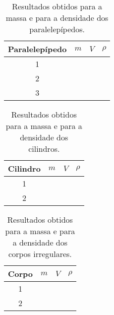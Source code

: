 \begin{table*}[!htpb]
	\label{TabelaDadosMassa}
	\begin{center}
	\begin{tabular}{cp{25mm}p{25mm}p{25mm}}
		\toprule
		Paralelepípedo & $m$ & $V$ & $\rho$ \\
		\midrule
		\cellcolor[gray]{0.89}1 & \cellcolor[gray]{0.92} & \cellcolor[gray]{0.89} & \cellcolor[gray]{0.92} \\
		\cellcolor[gray]{0.95}2 & \cellcolor[gray]{0.97} & \cellcolor[gray]{0.95} & \cellcolor[gray]{0.97} \\
		\cellcolor[gray]{0.89}3 & \cellcolor[gray]{0.92} & \cellcolor[gray]{0.89} & \cellcolor[gray]{0.92} \\
		\bottomrule
	\end{tabular}
	\end{center}
	\caption{Resultados obtidos para a massa e para a densidade dos paralelepípedos.}
\end{table*}

\begin{table*}[!ht]
	\label{TabelaDadosMassaCil}
	\begin{center}
	\begin{tabular}{cp{25mm}p{25mm}p{25mm}}
		\toprule
		Cilindro & $m$ & $V$ & $\rho$ \\
		\midrule
		\cellcolor[gray]{0.89}1 & \cellcolor[gray]{0.92} & \cellcolor[gray]{0.89} & \cellcolor[gray]{0.92} \\
		\cellcolor[gray]{0.95}2 & \cellcolor[gray]{0.97} & \cellcolor[gray]{0.95} & \cellcolor[gray]{0.97} \\
		\bottomrule
	\end{tabular}
	\end{center}
	\caption{Resultados obtidos para a massa e para a densidade dos cilindros.}
\end{table*}

\begin{table*}[!ht]
	\label{TabelaDadosMassaIrreg}
	\begin{center}
	\begin{tabular}{cp{25mm}p{25mm}p{25mm}}
		\toprule
		Corpo & $m$ & $V$ & $\rho$ \\
		\midrule
		\cellcolor[gray]{0.89}1 & \cellcolor[gray]{0.92} & \cellcolor[gray]{0.89} & \cellcolor[gray]{0.92} \\
		\cellcolor[gray]{0.95}2 & \cellcolor[gray]{0.97} & \cellcolor[gray]{0.95} & \cellcolor[gray]{0.97} \\
		\bottomrule
	\end{tabular}
	\end{center}
	\caption{Resultados obtidos para a massa e para a densidade dos corpos irregulares.}
\end{table*}

